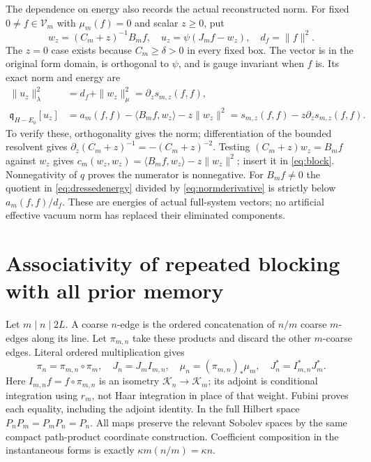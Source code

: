 \documentclass[11pt]{article}
\newcommand{\KK}{\mathscr K}
\newcommand{\VV}{\mathscr V}
\begin{document}
The dependence on energy also records the actual reconstructed norm.
For fixed $0\ne f\in\VV_m$ with $\mu_m(f)=0$ and scalar $z\geq0$, put
\begin{equation}\label{eq:dressed}
 w_z=(C_m+z)^{-1}B_mf,\quad
 u_z=\psi(J_mf-w_z),\quad d_f=\|f\|^2.
\end{equation}
The $z=0$ case exists because $C_m\geq\delta>0$ in every fixed box.
The vector is in the original form domain, is orthogonal to $\psi$,
and is gauge invariant when $f$ is. Its exact norm and energy are
\begin{align}
 \|u_z\|_\lambda^2&=d_f+\|w_z\|_\mu^2
                  =\partial_z s_{m,z}(f,f),\label{eq:normderivative}\\
 \mathfrak q_{H-E_0}[u_z]
 &=a_m(f,f)-\langle B_mf,w_z\rangle-z\|w_z\|^2
   =s_{m,z}(f,f)-z\partial_zs_{m,z}(f,f).\label{eq:dressedenergy}
\end{align}
To verify these, orthogonality gives the norm; differentiation of the
bounded resolvent gives $\partial_z(C_m+z)^{-1}=-(C_m+z)^{-2}$.
Testing $(C_m+z)w_z=B_mf$ against $w_z$ gives
$c_m(w_z,w_z)=\langle B_mf,w_z\rangle-z\|w_z\|^2$; insert it in
\eqref{eq:block}. Nonnegativity of $q$ proves the numerator is nonnegative.
For $B_mf\ne0$ the quotient in \eqref{eq:dressedenergy} divided by
\eqref{eq:normderivative} is strictly below $a_m(f,f)/d_f$.
These are energies of actual full-system vectors; no artificial effective
vacuum norm has replaced their eliminated components.

\section{Associativity of repeated blocking with all prior memory}

Let $m\mid n\mid2L$. A coarse $n$-edge is the ordered concatenation of
$n/m$ coarse $m$-edges along its line. Let $\pi_{m,n}$ take these products
and discard the other $m$-coarse edges. Literal ordered multiplication gives
\begin{equation}\label{eq:tower}
 \pi_n=\pi_{m,n}\circ\pi_m,\quad J_n=J_m I_{m,n},\quad
 \mu_n=(\pi_{m,n})_*\mu_m,\quad
 J_n^*=I_{m,n}^*J_m^*.
\end{equation}
Here $I_{m,n}f=f\circ\pi_{m,n}$ is an isometry $\KK_n\to\KK_m$;
its adjoint is conditional integration using $r_m$, not Haar integration
in place of that weight. Fubini proves each equality, including the adjoint
identity. In the full Hilbert space $P_nP_m=P_mP_n=P_n$.
All maps preserve the relevant Sobolev spaces by the same compact
path-product coordinate construction. Coefficient composition in the
instantaneous forms is exactly $\kappa m(n/m)=\kappa n$.
\end{document}
